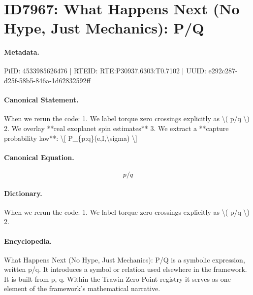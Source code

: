 \section*{ID7967: What Happens Next (No Hype, Just Mechanics): P/Q}
\paragraph{Metadata.}
PiID: 4533985626476 | RTEID: RTE:P30937.6303:T0.7102 | UUID: e292c287-d25f-58b5-846a-1d62832592ff

\paragraph{Canonical Statement.}
When we rerun the code: 1. We label torque zero crossings explicitly as \textbackslash{}( p/q \textbackslash{}) 2. We overlay **real exoplanet spin estimates** 3. We extract a **capture probability law**: \textbackslash{}[ P\_\{p:q\}(e,I,\textbackslash{}sigma) \textbackslash{}]

\paragraph{Canonical Equation.}
\[
p/q
\]

\paragraph{Dictionary.}
When we rerun the code: 1. We label torque zero crossings explicitly as \textbackslash{}( p/q \textbackslash{}) 2.

\paragraph{Encyclopedia.}
What Happens Next (No Hype, Just Mechanics): P/Q is a symbolic expression, written p/q. It introduces a symbol or relation used elsewhere in the framework. It is built from p, q. Within the Trawin Zero Point registry it serves as one element of the framework's mathematical narrative.
